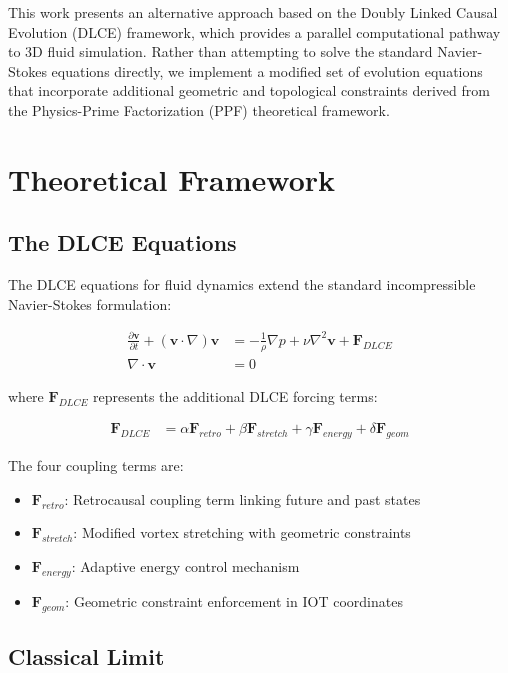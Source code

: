 \documentclass[conference]{IEEEtran}
\begin{document}
This work presents an alternative approach based on the Doubly Linked Causal Evolution (DLCE) framework, which provides a parallel computational pathway to 3D fluid simulation. Rather than attempting to solve the standard Navier-Stokes equations directly, we implement a modified set of evolution equations that incorporate additional geometric and topological constraints derived from the Physics-Prime Factorization (PPF) theoretical framework.

\section{Theoretical Framework}

\subsection{The DLCE Equations}

The DLCE equations for fluid dynamics extend the standard incompressible Navier-Stokes formulation:

\begin{align}
\frac{\partial \mathbf{v}}{\partial t} + (\mathbf{v} \cdot \nabla)\mathbf{v} &= -\frac{1}{\rho}\nabla p + \nu \nabla^2 \mathbf{v} + \mathbf{F}_{DLCE} \label{eq:dlce_momentum}\\
\nabla \cdot \mathbf{v} &= 0 \label{eq:dlce_continuity}
\end{align}

where $\mathbf{F}_{DLCE}$ represents the additional DLCE forcing terms:

\begin{align}
\mathbf{F}_{DLCE} &= \alpha \mathbf{F}_{retro} + \beta \mathbf{F}_{stretch} + \gamma \mathbf{F}_{energy} + \delta \mathbf{F}_{geom} \label{eq:dlce_forcing}
\end{align}

The four coupling terms are:
\begin{itemize}
\item $\mathbf{F}_{retro}$: Retrocausal coupling term linking future and past states
\item $\mathbf{F}_{stretch}$: Modified vortex stretching with geometric constraints  
\item $\mathbf{F}_{energy}$: Adaptive energy control mechanism
\item $\mathbf{F}_{geom}$: Geometric constraint enforcement in IOT coordinates
\end{itemize}

\subsection{Classical Limit}
\end{document}
